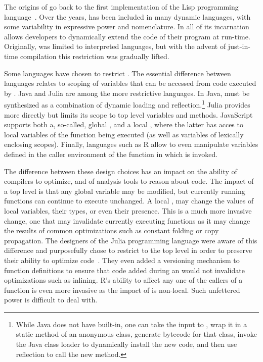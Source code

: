 \documentclass[conference]{IEEEtran}
\begin{document}
The origins of \eval go back to the first implementation of the Lisp
programming language~\cite{lisp}. Over the years, \eval has been included in
many dynamic languages, with some variability in expressive power and
nomenclature. In all of its incarnation \eval allows developers to
dynamically extend the code of their program at run-time.  Originally, \eval
was limited to interpreted languages, but with the advent of just-in-time
compilation this restriction was gradually lifted.

Some languages have chosen to restrict \eval. The essential difference
between languages relates to scoping of variables that can be accessed from
code executed by \eval.  Java and Julia are among the more restrictive
languages. In Java, \eval must be synthesized as a combination of dynamic
loading and reflection.\footnote{While Java does not have \eval built-in,
  one can take the input to \eval, wrap it in a static method of an
  anonymous class, generate bytecode for that class, invoke the Java class
  loader to dynamically install the new code, and then use reflection to
  call the new method.} Julia provides \eval more directly but limits its
scope to top level variables and methods. JavaScript supports both a,
so-called, global \eval, and a local \eval, where the latter has acces to
local variables of the function being executed (as well as variables of
lexically enclosing scopes). Finally, languages such as R allow \eval to
even manipulate variables defined in the caller environment of the function in
which \eval is invoked.

The difference between these design choices has an impact on the ability of
compilers to optimize, and of analysis tools to reason about code. The
impact of a top level \eval is that any global variable may be modified, but
currently running functions can continue to execute unchanged. A local
\eval, may change the values of local variables, their types, or even their
presence. This is a much more invasive change, one that may invalidate
currently executing functions as it may change the results of common
optimizations such as constant folding or copy propagation. The designers of
the Julia programming language were aware of this difference and
purposefully chose to restrict \eval to the top level in order to preserve
their ability to optimize code~\cite{oopsla18a}. They even added a
versioning mechanism to function definitions to ensure that code added
during an \eval would not invalidate optimizations such as inlining.  R's
ability to affect any one of the callers of a function is even more invasive
as the impact of \eval is non-local. Such unfettered power is difficult to
deal with.
\end{document}
